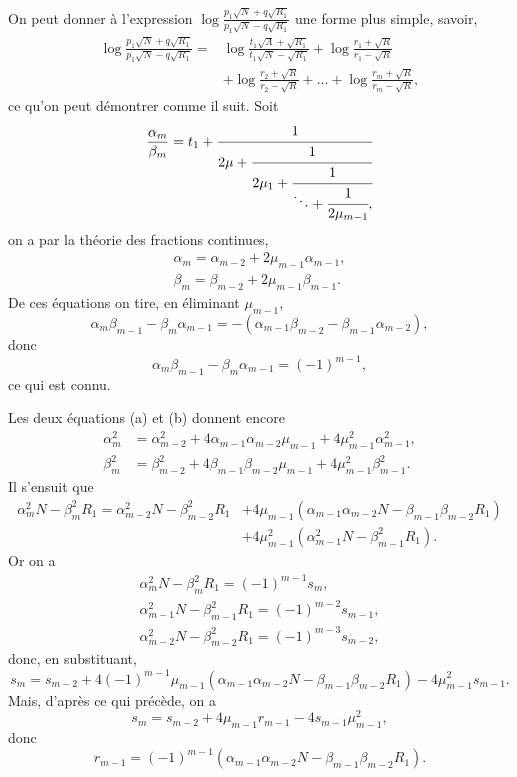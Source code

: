 \documentclass[oneside, 12 pt, leqno]{memoir}
\begin{document}
On peut donner à l'expression \(\log \frac{p_1 \sqrt{N}+q \sqrt{R_1}}{p_1 \sqrt{N}-q \sqrt{R_1}}\) une forme plus simple, savoir,
\[\begin{aligned}
\log \frac{p_1 \sqrt{N}+q \sqrt{R_1}}{p_1 \sqrt{N}-q \sqrt{R_1}}=&\log \frac{t_1 \sqrt{\Lambda}+\sqrt{R_1}}{t_1 \sqrt{N}-\sqrt{R_1}} +\log \frac{r_1+\sqrt{R}}{r_1-\sqrt{R}} \\
&+\log \frac{r_2+\sqrt{R}}{r_2-\sqrt{R}}+\dots+\log \frac{r_m+\sqrt{R}}{r_m-\sqrt{R}},
\end{aligned}\]
ce qu'on peut démontrer comme il suit. Soit
\[\frac{\alpha_m}{\beta_m}=t_1+\cfrac{1}{2 \mu+\cfrac{1}{2 \mu_1+\cfrac{1}{\ddots+\cfrac{1}{2 \mu_{m-1}},}}}\]
on a par la théorie des fractions continues,
\begin{align*}
\tag{a} \alpha_m=\alpha_{m-2}+2 \mu_{m-1} \alpha_{m-1}, \\
\tag{b} \beta_m=\beta_{m-2}+2 \mu_{m-1} \beta_{m-1}.
\end{align*}
De ces équations on tire, en éliminant \(\mu_{m-1}\),
\[\alpha_m \beta_{m-1}-\beta_m \alpha_{m-1}=-\left(\alpha_{m-1} \beta_{m-2}-\beta_{m-1} \alpha_{m-2}\right),\]
donc
\[\alpha_m \beta_{m-1}-\beta_m \alpha_{m-1}=(-1)^{m-1},\]
ce qui est connu.

Les deux équations (a) et (b) donnent encore
\[\begin{aligned}
\alpha_m^2&=\alpha_{m-2}^2+4 \alpha_{m-1} \alpha_{m-2} \mu_{m-1}+4 \mu_{m-1}^2 \alpha_{m-1}^2, \\
\beta_m^2&=\beta_{m-2}^2+4 \beta_{m-1} \beta_{m-2} \mu_{m-1}+4 \mu_{m-1}^2 \beta_{m-1}^2.
\end{aligned}\]
Il s'ensuit que
\[\begin{aligned}
\alpha_m^2 N-\beta_m^2 R_1=\alpha_{m-2}^2 N-\beta_{m-2}^2 R_1&+4 \mu_{m-1}\left(\alpha_{m-1} \alpha_{m-2} N-\beta_{m-1} \beta_{m-2} R_1\right) \\
&+4 \mu_{m-1}^2\left(\alpha_{m-1}^2 N-\beta_{m-1}^2 R_1\right).
\end{aligned}\]
Or on a
\[\begin{gathered}
\alpha_m^2 N-\beta_m^2 R_1=(-1)^{m-1} s_m, \\
\alpha_{m-1}^2 N-\beta_{m-1}^2 R_1=(-1)^{m-2} s_{m-1}, \\
\alpha_{m-2}^2 N-\beta_{m-2}^2 R_1=(-1)^{m-3} s_{m-2},
\end{gathered}\]
donc, en substituant,
\[s_m=s_{m-2}+4(-1)^{m-1} \mu_{m-1}\left(\alpha_{m-1} \alpha_{m-2} N-\beta_{m-1} \beta_{m-2} R_1\right)-4 \mu_{m-1}^2 s_{m-1} .\]
Mais, d'après ce qui précède, on a
\[s_m=s_{m-2}+4 \mu_{m-1} r_{m-1}-4 s_{m-1} \mu_{m-1}^2,\]
donc
\[r_{m-1}=(-1)^{m-1}\left(\alpha_{m-1} \alpha_{m-2} N-\beta_{m-1} \beta_{m-2} R_1\right).\]
\end{document}
